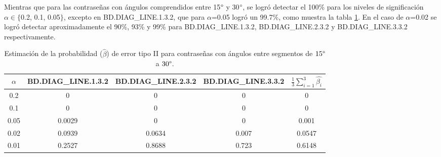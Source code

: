 \documentclass[12pt]{report}
\begin{document}
Mientras que para las contraseñas con ángulos comprendidos entre 15$\degree$ y 30$\degree$, se logró detectar el 100\% para los niveles de significación $\alpha \in \{$0.2, 0.1, 0.05$\}$, excepto en BD.DIAG\_LINE.1.3.2, que para $\alpha$=0.05 logró un 99.7\%, como muestra la tabla \ref{tab:error2-15-30}. En el caso de $\alpha$=0.02 se logró detectar aproximadamente el 90\%, 93\% y 99\% para BD.DIAG\_LINE.1.3.2, BD.DIAG\_LINE.2.3.2 y BD.DIAG\_LINE.3.3.2 respectivamente.

\begin{table}[h!]
	\centering
	\begin{tabular}{|c|ccc|c|}
		\hline
		$\alpha$& BD.DIAG\_LINE.1.3.2 & BD.DIAG\_LINE.2.3.2 & BD.DIAG\_LINE.3.3.2 &$\frac{1}{3} \sum_{i=1}^{3} \hat{\beta_i}$ \\
		\hline
		0.2 & 0     	    & 0     		& 0     & 0    \\
		0.1 & 0			    & 0   	   	    & 0     &  0   \\
		0.05& 0.0029     	& 0     	 & 0     & 0.001 \\
		0.02& 0.0939     	& 0.0634   	 & 0.007 & 0.0547    \\
		0.01& 0.2527     	& 0.8688   & 0.723 & 0.6148     \\
		\hline
	\end{tabular}
	\caption{Estimación de la probabilidad ($\hat{\beta}$) de error tipo II para contraseñas con ángulos entre segmentos de $15\degree$ a $30\degree$.}
	\label{tab:error2-15-30}
\end{table}
\end{document}
